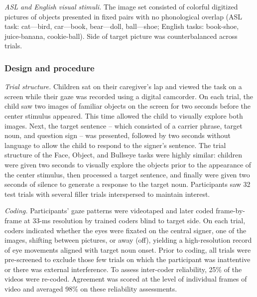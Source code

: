 \documentclass[oneside]{report}
\begin{document}
\emph{ASL and English visual stimuli.} The image set consisted of
colorful digitized pictures of objects presented in fixed pairs with no
phonological overlap (ASL task: cat---bird, car---book, bear---doll,
ball---shoe; English tasks: book-shoe, juice-banana, cookie-ball). Side
of target picture was counterbalanced across trials.

\subsubsection{Design and procedure}\label{design-and-procedure}

\emph{Trial structure.} Children sat on their caregiver's lap and viewed
the task on a screen while their gaze was recorded using a digital
camcorder. On each trial, the child saw two images of familiar objects
on the screen for two seconds before the center stimulus appeared. This
time allowed the child to visually explore both images. Next, the target
sentence -- which consisted of a carrier phrase, target noun, and
question sign -- was presented, followed by two seconds without language
to allow the child to respond to the signer's sentence. The trial
structure of the Face, Object, and Bullseye tasks were highly similar:
children were given two seconds to visually explore the objects prior to
the appearance of the center stimulus, then processed a target sentence,
and finally were given two seconds of silence to generate a response to
the target noun. Participants saw 32 test trials with several filler
trials interspersed to maintain interest.

\emph{Coding.} Participants' gaze patterns were videotaped and later
coded frame-by-frame at 33-ms resolution by trained coders blind to
target side. On each trial, coders indicated whether the eyes were
fixated on the central signer, one of the images, shifting between
pictures, or away (off), yielding a high-resolution record of eye
movements aligned with target noun onset. Prior to coding, all trials
were pre-screened to exclude those few trials on which the participant
was inattentive or there was external interference. To assess
inter-coder reliability, 25\% of the videos were re-coded. Agreement was
scored at the level of individual frames of video and averaged 98\% on
these reliability assessments.
\end{document}
